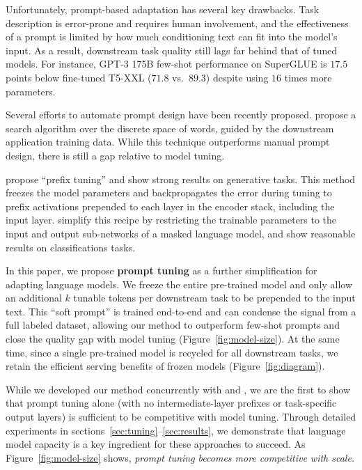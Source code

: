 Unfortunately, prompt-based adaptation has several key drawbacks. Task description is error-prone and requires human involvement, and the effectiveness of a prompt is limited by how much conditioning text can fit into the model's input. As a result, downstream task quality still lags far behind that of tuned models. For instance, \mbox{GPT-3} 175B few-shot performance on SuperGLUE is $17.5$ points below fine-tuned T5-XXL \cite{raffel_2020_t5} ($71.8$ vs.~$89.3$) despite using $16$ times more parameters.

Several efforts to automate prompt design have been recently proposed.
\citet{shin-etal-2020-autoprompt} propose a search algorithm over the discrete space of words, guided by the downstream application training data. While this technique outperforms manual prompt design, there is still a gap relative to model tuning.

\citet{li_2021_prefix_tuning} propose ``prefix tuning'' and show strong results on generative tasks. This method freezes the model parameters and backpropagates the error during tuning to prefix activations prepended to each layer in the encoder stack, including the input layer.
\citet{hambardzumyan_2021_warp} simplify this recipe by restricting the trainable parameters to the input and output sub-networks of a masked language model, and show reasonable results on classifications tasks.

In this paper, we propose \textbf{prompt tuning} as a further simplification for adapting language models. We freeze the entire pre-trained model and only allow an additional $k$ tunable tokens per downstream task to be prepended to the input text. This ``soft prompt'' is trained end-to-end and can condense the signal from a full labeled dataset, allowing our method to outperform few-shot prompts and close the quality gap with model tuning (Figure~\ref{fig:model-size}). At the same time, since a single pre-trained model is recycled for all downstream tasks, we retain the efficient serving benefits of frozen models (Figure~\ref{fig:diagram}).

While we developed our method concurrently with \citet{li_2021_prefix_tuning} and \citet{hambardzumyan_2021_warp}, we are the first to show that prompt tuning alone (with no intermediate-layer prefixes or task-specific output layers) is sufficient to be competitive with model tuning. Through detailed experiments in sections~\ref{sec:tuning}--\ref{sec:results}, we demonstrate that language model capacity is a key ingredient for these approaches to succeed. As Figure~\ref{fig:model-size} shows, \emph{prompt tuning becomes more competitive with scale.}


